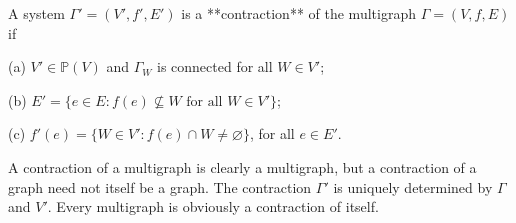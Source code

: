 A system $\Gamma' = (V', f', E')$ is a **contraction** of the multigraph $\Gamma = (V, f, E)$ if

(a) $V' \in \mathbb{P}(V)$ and $\Gamma_W$ is connected for all $W \in V'$;

(b) $E' = \{e \in E : f(e) \not\subseteq W \text{ for all } W \in V'\}$;

(c) $f'(e) = \{W \in V' : f(e) \cap W \neq \varnothing\}$, for all $e \in E'$.

A contraction of a multigraph is clearly a multigraph, but a contraction of a graph need not itself be a graph. The contraction $\Gamma'$ is uniquely determined by $\Gamma$ and $V'$. Every multigraph is obviously a contraction of itself.
